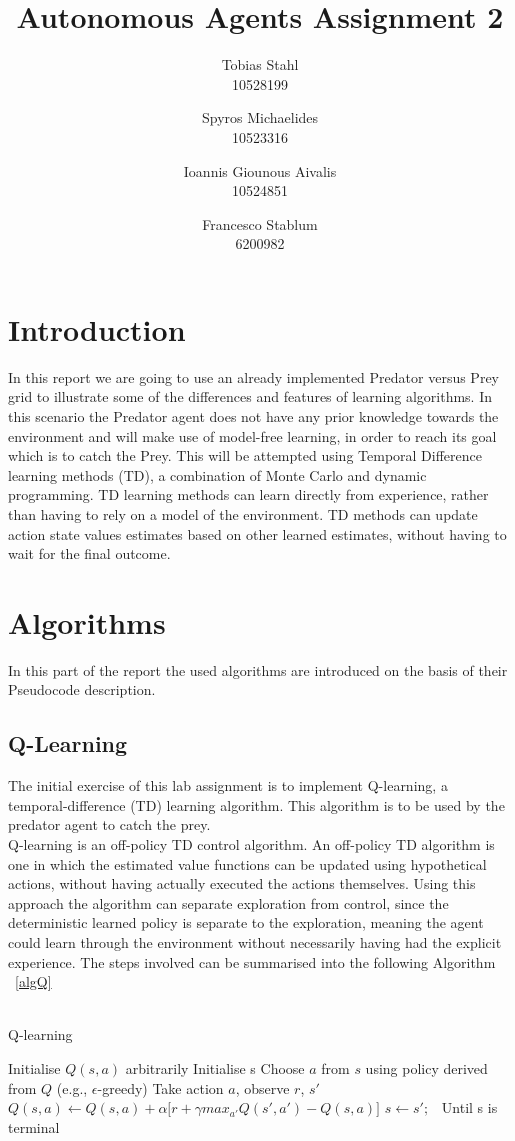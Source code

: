 \documentclass[11pt]{article}
\title{
	\textbf{Autonomous Agents Assignment 2}
}
\author{Tobias Stahl \\ 10528199 \and Spyros Michaelides \\ 10523316 \and Ioannis Giounous Aivalis \\ 10524851 \and Francesco Stablum \\ 6200982}
\begin{document}
\maketitle


\section{Introduction}
In this report we are going to use an already implemented Predator versus Prey grid to illustrate some of the differences and features of learning algorithms. In this scenario the Predator agent does not have any prior knowledge towards the environment and will make use of model-free learning, in order to reach its goal which is to catch the Prey. This will be attempted  using Temporal Difference learning methods (TD), a combination of Monte Carlo and dynamic programming. TD learning methods can learn directly from experience, rather than having to rely on a model of the environment. TD methods can update action state values estimates based on other learned estimates, without having to wait for the final outcome. 

\section{Algorithms}
In this part of the report the used algorithms are introduced on the basis of their Pseudocode description.


\subsection{Q-Learning}
The initial exercise of this lab assignment is to implement Q-learning, a temporal-difference (TD) learning algorithm. This algorithm is to be used by the predator agent to catch the prey.\\
Q-learning is an off-policy TD control algorithm. An off-policy TD algorithm is one in which the estimated value functions can be updated using hypothetical actions, without having actually executed the actions themselves. Using this approach the algorithm can separate exploration from control, since the deterministic learned policy is separate to the exploration, meaning the agent could learn through the environment without necessarily having had the explicit experience.
The steps involved can be summarised into the following Algorithm ~\ref{algQ}\\\\


\begin{algorithm}
\caption{Q-learning}
\begin{algorithmic}[1]
\label{algQ}
\STATE Initialise $Q(s,a)$ arbitrarily
\STATE Initialise s
\STATE Choose $a$ from $s$ using policy derived from $Q$ (e.g., $\epsilon$-greedy)
\STATE Take action $a$, observe $r$, $s'$
\STATE $Q(s,a) \leftarrow Q(s,a) + \alpha \lbrack r + \gamma max_{a'} Q(s',a') - Q(s,a)\rbrack$
\STATE $s \leftarrow s';$\
\ENDFOR
\STATE Until s is terminal
\ENDFOR
\end{algorithmic}
\end{algorithm}
\end{document}

